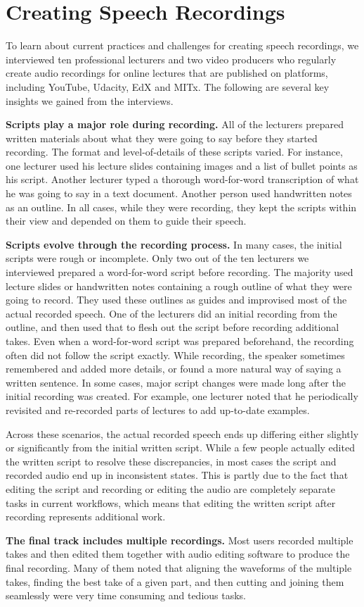 \section{Creating Speech Recordings}

To learn about current practices and challenges for creating speech recordings, we interviewed ten professional lecturers and two video producers who regularly create audio recordings for online lectures that are published on platforms, including YouTube, Udacity, EdX and MITx. The following are several key insights we gained from the interviews.

\textbf{Scripts play a major role during recording.} All of the lecturers prepared written materials about what they were going to say before they started recording. The format and level-of-details of these scripts varied. For instance, one lecturer used his lecture slides containing images and a list of bullet points as his script. Another lecturer typed a thorough word-for-word transcription of what he was going to say in a text document. Another person used handwritten notes as an outline. In all cases, while they were recording, they kept the scripts within their view and depended on them to guide their speech.  

\textbf{Scripts evolve through the recording process.}  In many cases, the initial scripts were rough or incomplete. Only two out of the ten lecturers we interviewed prepared a word-for-word script before recording. The majority used lecture slides or handwritten notes containing a rough outline of what they were going to record. They used these outlines as guides and improvised most of the actual recorded speech. One of the lecturers did an initial recording from the outline, and then used that to flesh out the script before recording additional takes. Even when a word-for-word script was prepared beforehand, the recording often did not follow the script exactly. While recording, the speaker sometimes remembered and added more details, or found a more natural way of saying a written sentence. In some cases, major script changes were made long after the initial recording was created. For example, one lecturer noted that he periodically revisited and re-recorded parts of lectures to add up-to-date examples.

Across these scenarios, the actual recorded speech ends up differing either slightly or significantly from the initial written script.  While a few people actually edited the written script to resolve these discrepancies, in most cases the script and recorded audio end up in inconsistent states. This is partly due to the fact that editing the script and recording or editing the audio are  completely separate tasks in current workflows, which means that editing the written script after recording represents additional work.  

\textbf{The final track includes multiple recordings.} Most users recorded multiple takes and then edited them together with audio editing software to produce the final recording. Many of them noted that aligning the waveforms of the multiple takes, finding the best take of a given part, and then cutting and joining them seamlessly were very time consuming and tedious tasks.

